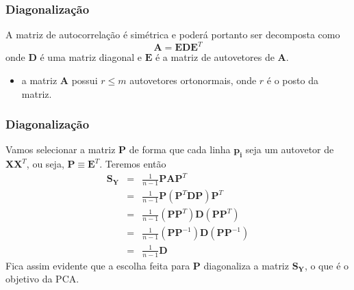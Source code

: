 \begin{frame}[allowframebreaks]
  \frametitle{Diagonalização}
  A matriz de autocorrelação é simétrica e poderá portanto ser decomposta como
  \begin{equation}
  \mathbf{A} = \mathbf{E} \mathbf{D} \mathbf{E}^{T}
  \end{equation}
  onde $\mathbf{D}$ é uma matriz diagonal e $\mathbf{E}$ é a matriz de autovetores de $\mathbf{A}$.


  \begin{itemize}
  \item a matriz $\mathbf{A}$ possui $r \leq m$ autovetores ortonormais, onde $r$ é o posto da matriz.
  \end{itemize}  
\end{frame}

\begin{frame}[allowframebreaks]
  \frametitle{Diagonalização}
  Vamos selecionar a matriz $\mathbf{P}$ de forma que cada linha $\mathbf{p_i}$ seja um autovetor de $\mathbf{X}\mathbf{X}^T$, ou seja, $\mathbf{P} \equiv \mathbf{E}^T$.
  Teremos então
  \begin{eqnarray}
  \mathbf{S_Y} &=& \frac{1}{n-1} \mathbf{P} \mathbf{A} \mathbf{P}^T \nonumber \\
               &=& \frac{1}{n-1} \mathbf{P} (\mathbf{P}^T \mathbf{D} \mathbf{P} ) \mathbf{P}^T  \nonumber \\
               &=& \frac{1}{n-1} (\mathbf{P} \mathbf{P}^T) \mathbf{D} (\mathbf{P} \mathbf{P}^T) \nonumber \\
               &=& \frac{1}{n-1} (\mathbf{P} \mathbf{P}^{-1}) \mathbf{D} (\mathbf{P} \mathbf{P}^{-1}) \nonumber \\
               &=& \frac{1}{n-1} \mathbf{D}
  \end{eqnarray}
  Fica assim evidente que a escolha feita para $\mathbf{P}$ diagonaliza a matriz $\mathbf{S_Y}$, o que é o objetivo da PCA. 
\end{frame}

